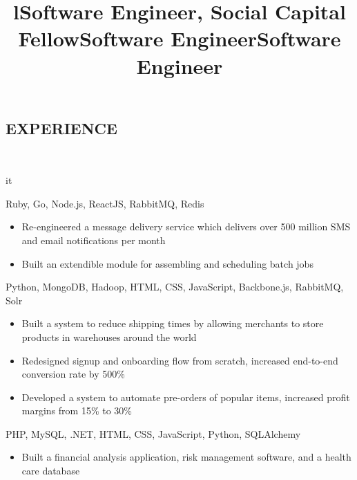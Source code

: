\documentclass[]{res}
\begin{document}
\begin{resume}
\section{EXPERIENCE}
  \begin{format}  \\ \title{l}{it} \\ \body \end{format}
  \title{Software Engineer, Social Capital Fellow}
  \begin{position}
    \begin{description}
      \item Ruby, Go, Node.js, ReactJS, RabbitMQ, Redis
    \end{description}
    \begin{itemize}
      \item Re-engineered a message delivery service which delivers over 500 million
        SMS and email notifications per month
      \item Built an extendible module for assembling and scheduling batch jobs
    \end{itemize}
  \end{position}
  \title{Software Engineer}
  \begin{position}
    \begin{description}
      \item Python, MongoDB, Hadoop, HTML, CSS, JavaScript, Backbone.js, RabbitMQ, Solr
    \end{description}
    \begin{itemize}
      \item Built a system to reduce shipping times by allowing merchants to store products in warehouses
        around the world
      \item Redesigned signup and onboarding flow from scratch, increased end-to-end conversion rate by 500\%
      \item Developed a system to automate pre-orders of popular items, increased profit margins from 15\% to 30\%
    \end{itemize}
  \end{position}
  \title{Software Engineer}
  \begin{position}
    \begin{description}
      \item PHP, MySQL, .NET, HTML, CSS, JavaScript, Python, SQLAlchemy
    \end{description}
    \begin{itemize}
      \item Built a financial analysis application, risk management software, and a health care database
    \end{itemize}
  \end{position}


\end{resume}
\end{document}
